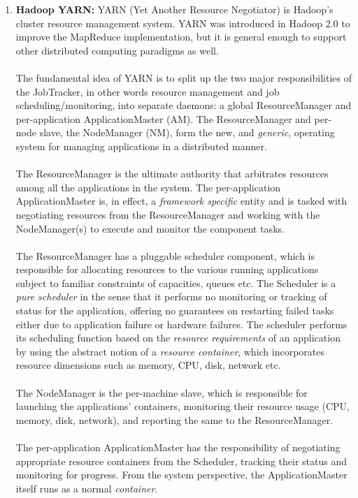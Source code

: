 \documentclass[a4paper,12pt,oneside]{report}
\begin{document}
\begin{enumerate}
        \item \textbf{Hadoop YARN:}
                YARN (Yet Another Resource Negotiator) is Hadoop’s cluster resource management
                system. YARN was introduced in Hadoop 2.0 to improve the MapReduce implementation,
                but it is general enough to support other distributed computing paradigms
                as well.\\
\\
                The fundamental idea of YARN is to split up the two major responsibilities of the JobTracker,
                in other words resource management and job scheduling/monitoring, into separate daemons: a
                global ResourceManager and per-application ApplicationMaster (AM). The ResourceManager
                and per-node slave, the NodeManager (NM), form the new, and \textit{generic}, operating system for
                managing applications in a distributed manner.\\ 
\\
                The ResourceManager is the ultimate authority that arbitrates resources among all the
                applications in the system. The per-application ApplicationMaster is, in effect, a \textit{framework
                specific} entity and is tasked with negotiating resources from the ResourceManager and working
                with the NodeManager(s) to execute and monitor the component tasks.\\
\\
                The ResourceManager has a pluggable scheduler component, which is responsible for
                allocating resources to the various running applications subject to familiar constraints of
                capacities, queues etc. The Scheduler is a \textit{pure scheduler} in the sense that it performs no
                monitoring or tracking of status for the application, offering no guarantees on restarting failed
                tasks either due to application failure or hardware failures. The scheduler performs its
                scheduling function based on the \textit{resource requirements} of an application by using the abstract
                notion of a \textit{resource container}, which incorporates resource dimensions such as memory, CPU,
                disk, network etc.\\ 
\\
                The NodeManager is the per-machine slave, which is responsible for launching the
                applications’ containers, monitoring their resource usage (CPU, memory, disk, network), and
                reporting the same to the ResourceManager.\\
\\
                The per-application ApplicationMaster has the responsibility of negotiating appropriate
                resource containers from the Scheduler, tracking their status and monitoring for progress. From
                the system perspective, the ApplicationMaster itself runs as a normal \textit{container}.


\end{enumerate}
\end{document}

